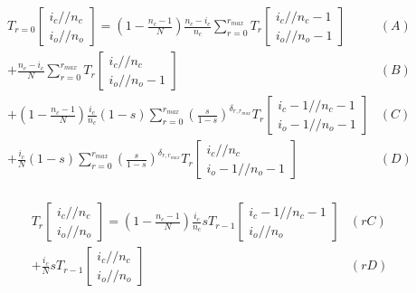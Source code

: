 \documentclass[preview]{standalone}
\newcommand{\Coalc}[4]{\begin{bmatrix}#1 /\!\!/ #2 \\ #3 /\!\!/ #4 \end{bmatrix}}
\begin{document}
\begin{equation*}
  \begin{aligned}
    T_{r=0}\Coalc{i_c}{n_c}{i_o}{n_o}
    = \left(1-\frac{n_c-1}{N}\right) \frac{n_c-i_c}{n_c}       \sum_{r=0}^{r_{max}}                                                 T_{r}\Coalc{i_c  }{n_c-1}{i_o  }{n_o-1} & (A) \\
    +                                \frac{n_c-i_c}{N}         \sum_{r=0}^{r_{max}}                                                 T_{r}\Coalc{i_c  }{n_c  }{i_o  }{n_o-1} & (B) \\
    + \left(1-\frac{n_c-1}{N}\right) \frac{i_c}{n_c}     (1-s) \sum_{r=0}^{r_{max}} \left(\frac{s}{1-s}\right)^{\delta_{r,r_{max}}} T_{r}\Coalc{i_c-1}{n_c-1}{i_o-1}{n_o-1} & (C) \\
    +                                \frac{i_c}{N}       (1-s) \sum_{r=0}^{r_{max}} \left(\frac{s}{1-s}\right)^{\delta_{r,r_{max}}} T_{r}\Coalc{i_c  }{n_c  }{i_o-1}{n_o-1} & (D) \\
  \end{aligned}
\end{equation*}

\begin{equation*}
  \begin{aligned}
    T_{r}\Coalc{i_c}{n_c}{i_o}{n_o}
    = \left(1-\frac{n_c-1}{N}\right) \frac{i_c}{n_c} s T_{r-1} \Coalc{i_c-1}{n_c-1}{i_o}{n_o}& (rC) \\
    +                                \frac{i_c}{N}   s T_{r-1} \Coalc{i_c  }{n_c  }{i_o}{n_o}& (rD) \\
  \end{aligned}
\end{equation*}
\end{document}
